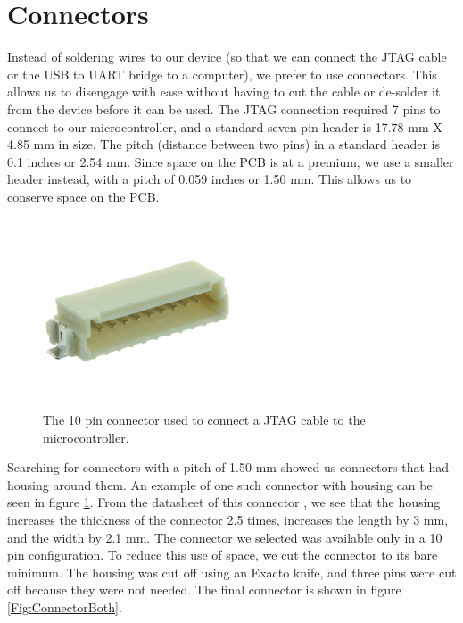 \section{Connectors}
\label{Sec:Connetors}
Instead of soldering wires to our device (so that we can connect the JTAG cable or the USB to UART bridge to a computer), we prefer to use connectors. This allows us to disengage with ease without having to cut the cable or de-solder it from the device before it can be used. The JTAG connection required 7 pins to connect to our microcontroller, and a standard seven pin header is 17.78 mm X 4.85 mm in size. The pitch (distance between two pins) in a standard header is 0.1 inches or 2.54 mm. Since space on the PCB is at a premium, we use a smaller header instead, with a pitch of 0.059 inches or 1.50 mm. This allows us to conserve space on the PCB.
\begin{figure}
\begin{center}
\includegraphics[width=0.5\textwidth]{images/ConnectorWhole.JPG}
\caption{The 10 pin connector used to connect a JTAG cable to the microcontroller.}
\label{Fig:ConnectorWhole}
\end{center}
\end{figure}
Searching for connectors with a pitch of 1.50 mm showed us connectors that had housing around them.
An example of one such connector with housing can be seen in figure \ref{Fig:ConnectorWhole}.
From the datasheet of this connector \cite{Datasheet:TEConnHeader},
we see that the housing increases the thickness of the connector 2.5 times,
increases the length by 3 mm,
and the width by 2.1 mm. The connector we selected was available only in a 10 pin configuration.
To reduce this use of space, we cut the connector to its bare minimum.
The housing was cut off using an Exacto knife,
and three pins were cut off because they were not needed.
The final connector is shown in figure \ref{Fig:ConnectorBoth}.
